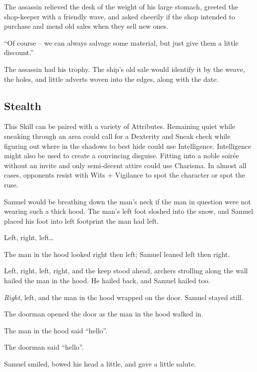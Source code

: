 \begin{multicols}{2}
\begin{exampletext}
  The assassin relieved the desk of the weight of his large stomach, greeted the shop-keeper with a friendly wave, and asked cheerily if the shop intended to purchase and mend old sales when they sell new ones.

  ``Of course -- we can always salvage some material, but just give them a little discount.''

  The assassin had his trophy.
  The ship's old sale would identify it by the weave, the holes, and little adverts woven into the edges, along with the date.

\end{exampletext}

\subsection{Stealth}

This Skill can be paired with a variety of Attributes.
Remaining quiet while sneaking through an area could call for a Dexterity and Sneak check while figuring out where in the shadows to best hide could use Intelligence.
Intelligence might also be used to create a convincing disguise.
Fitting into a noble soir\'{e}e without an invite and only semi-decent attire could use Charisma.
In almost all cases, opponents resist with Wits + Vigilance to spot the character or spot the ruse.

\begin{exampletext}
  Samuel would be breathing down the man's neck if the man in question were not wearing such a thick hood.
  The man's left foot sloshed into the snow, and Samuel placed his foot into left footprint the man had left.

  Left, right, left\ldots

  The man in the hood looked right then left; Samuel leaned left then right.

  Left, right, left, right, and the keep stood ahead, archers strolling along the wall hailed the man in the hood.
  He hailed back, and Samuel hailed too.

  \emph{Right}, left, and the man in the hood wrapped on the door.
  Samuel stayed still.

  The doorman opened the door as the man in the hood walked in.

  The man in the hood said ``hello''.

  The doorman said ``hello''.

  Samuel smiled, bowed his head a little, and gave a little salute.


\end{exampletext}
\end{multicols}
